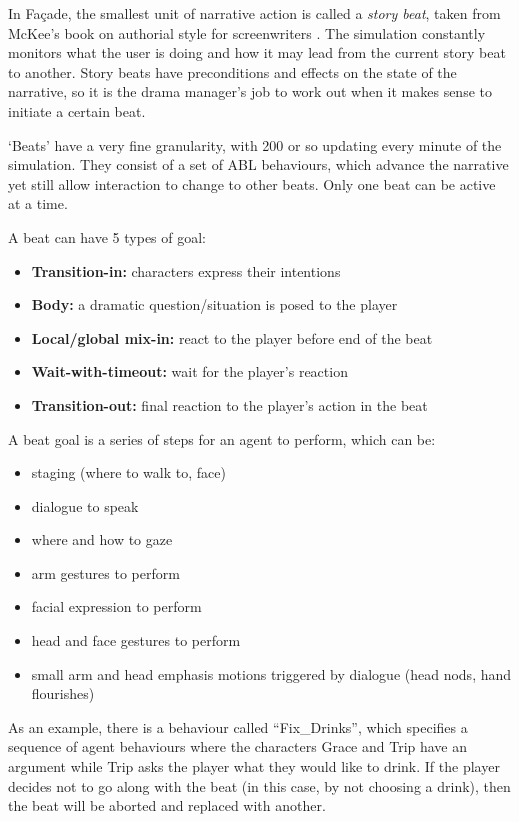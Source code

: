 \documentclass[11pt]{report}
\begin{document}
In Fa\c{c}ade, the smallest unit of narrative action is called a \emph{story beat}, taken from McKee's book on authorial style for screenwriters \citep{mckee1997substance}. The simulation constantly monitors what the user is doing and how it may lead from the current story beat to another. Story beats have preconditions and effects on the state of the narrative, so it is the drama manager's job to work out when it makes sense to initiate a certain beat.

`Beats' have a very fine granularity, with 200 or so updating every minute of the simulation. They consist of a set of ABL behaviours, which advance the narrative yet still allow interaction to change to other beats. Only one beat can be active at a time.

A beat can have 5 types of goal:

\begin{itemize}
  \item \textbf{Transition-in:} characters express their intentions
  \item \textbf{Body:} a dramatic question/situation is posed to the player
  \item \textbf{Local/global mix-in:} react to the player before end of the beat
  \item \textbf{Wait-with-timeout:} wait for the player's reaction
  \item \textbf{Transition-out:} final reaction to the player's action in the beat
\end{itemize}

A beat goal is a series of steps for an agent to perform, which can be:

\begin{itemize}
  \item staging (where to walk to, face)
  \item dialogue to speak
  \item where and how to gaze
  \item arm gestures to perform
  \item facial expression to perform
  \item head and face gestures to perform
  \item small arm and head emphasis motions triggered by dialogue (head nods, hand flourishes)
\end{itemize}

As an example, there is a behaviour called ``Fix\_Drinks'', which specifies a sequence of agent behaviours where the characters Grace and Trip have an argument while Trip asks the player what they would like to drink. If the player decides not to go along with the beat (in this case, by not choosing a drink), then the beat will be aborted and replaced with another.
\end{document}
